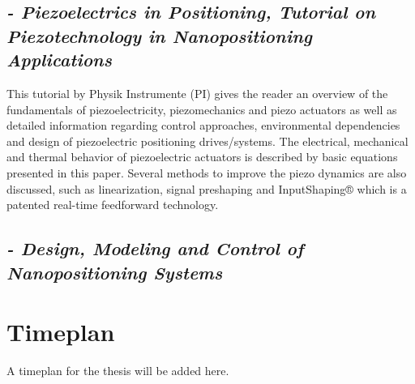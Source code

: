 \subsection*{\citep*{Piezo:2008} {\small \emph{- Piezoelectrics in Positioning, Tutorial on Piezotechnology in Nanopositioning Applications}} }
This tutorial by Physik Instrumente (PI) gives the reader an overview of the fundamentals of piezoelectricity, piezomechanics and piezo actuators as well as detailed information regarding control approaches, environmental dependencies and design of piezoelectric positioning drives/systems. The electrical, mechanical and thermal behavior of piezoelectric actuators is described by basic equations presented in this paper. Several methods to improve the piezo dynamics are also discussed, such as linearization, signal preshaping and InputShaping® which is a patented real-time feedforward technology.


\subsection*{\citep*{FlemingLeang:2014} {\small \emph{- Design, Modeling and Control of Nanopositioning Systems}} }



\section{Timeplan}
A timeplan for the thesis will be added here.
